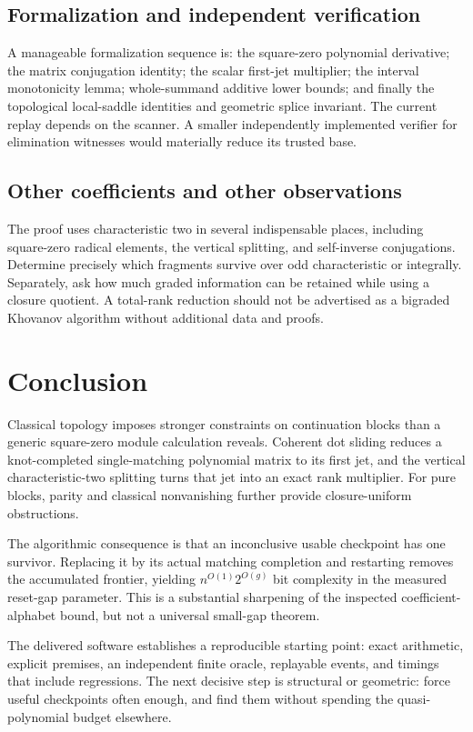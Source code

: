 \documentclass[11pt]{article}
\theoremstyle{definition}\newtheorem{definition}[theorem]{Definition}\newtheorem{example}[theorem]{Example}
\theoremstyle{remark}\newtheorem{remark}[theorem]{Remark}
\begin{document}
\subsection{Formalization and independent verification}
A manageable formalization sequence is: the square-zero polynomial derivative; the matrix conjugation identity; the scalar first-jet multiplier; the interval monotonicity lemma; whole-summand additive lower bounds; and finally the topological local-saddle identities and geometric splice invariant. The current replay depends on the scanner. A smaller independently implemented verifier for elimination witnesses would materially reduce its trusted base.

\subsection{Other coefficients and other observations}
The proof uses characteristic two in several indispensable places, including square-zero radical elements, the vertical splitting, and self-inverse conjugations. Determine precisely which fragments survive over odd characteristic or integrally. Separately, ask how much graded information can be retained while using a closure quotient. A total-rank reduction should not be advertised as a bigraded Khovanov algorithm without additional data and proofs.

\section{Conclusion}
Classical topology imposes stronger constraints on continuation blocks than a generic square-zero module calculation reveals. Coherent dot sliding reduces a knot-completed single-matching polynomial matrix to its first jet, and the vertical characteristic-two splitting turns that jet into an exact rank multiplier. For pure blocks, parity and classical nonvanishing further provide closure-uniform obstructions.

The algorithmic consequence is that an inconclusive usable checkpoint has one survivor. Replacing it by its actual matching completion and restarting removes the accumulated frontier, yielding $n^{O(1)}2^{O(g)}$ bit complexity in the measured reset-gap parameter. This is a substantial sharpening of the inspected coefficient-alphabet bound, but not a universal small-gap theorem.

The delivered software establishes a reproducible starting point: exact arithmetic, explicit premises, an independent finite oracle, replayable events, and timings that include regressions. The next decisive step is structural or geometric: force useful checkpoints often enough, and find them without spending the quasi-polynomial budget elsewhere.
\end{document}
